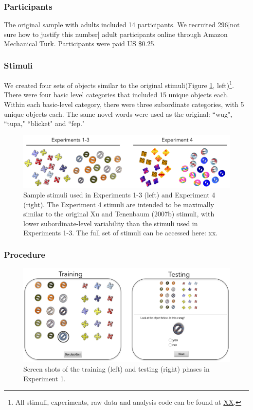\documentclass[man]{apa2}
\begin{document}
\subsubsection{Participants} 
The original sample with adults included 14 participants. We recruited 296[not sure how to justify this number] adult participants online through Amazon Mechanical Turk. Participants were paid US \$0.25. 
\subsubsection{Stimuli}
We created four sets of objects similar to the original  stimuli(Figure \ref{fig:stims}, left)\footnote{All stimuli, experiments, raw data and analysis code can be found at \url{XX}.}. There were four basic level categories that included 15 unique objects each. Within each basic-level category, there were three subordinate categories, with 5 unique objects each. The same novel words were used as the original: ``wug", ``tupa," ``blicket" and ``fep."
\begin{figure}[t]
 \begin{center} 
  \includegraphics[width=5in]{figures/stims.png} 
  \caption{ \label{fig:stims} Sample stimuli used in Experiments 1-3 (left) and Experiment 4 (right). The Experiment 4 stimuli are intended to be maximally similar to the original Xu and Tenenbaum (2007b) stimuli, with lower subordinate-level variability than the stimuli used in Experiments 1-3. The full set of stimuli can be accessed here: xx. 
 } 
 \end{center} 
\end{figure}	
 
\subsubsection{Procedure}
 \begin{figure} [t]
 \begin{center} 
  \includegraphics[width=5.5in]{figures/screen.png} 
  \caption{\label{fig:screen} Screen shots of the training (left) and testing (right) phases in Experiment 1. } 
 \end{center} 
\end{figure}
\end{document}
